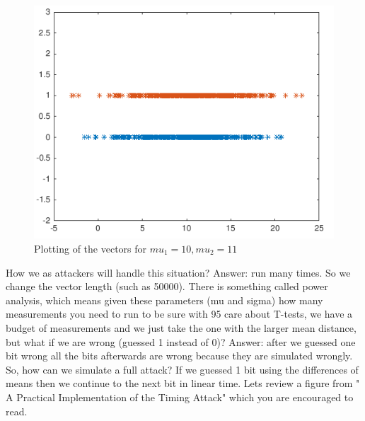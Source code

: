 \begin{figure}[!ht]
    \centering
    \includegraphics[scale=0.6]{images/defmatplot2.png}
    \caption{Plotting of the vectors for \(mu_1 = 10, mu_2 = 11\)} \label{fig:defmatplot2}
\end{figure}

How we as attackers will handle this situation? Answer: run many times. So we
change the vector length (such as 50000). There is something called power
analysis, which means given these parameters (mu and sigma) how many
measurements you need to run to be sure with 95%
care about T-tests, we have a budget of measurements and we just take the one
with the larger mean distance, but what if we are wrong (guessed 1 instead of
0)? Answer: after we guessed one bit wrong all the bits afterwards are wrong
because they are simulated wrongly. So, how can we simulate a full attack? If we
guessed 1 bit using the differences of means then we continue to the next bit in
linear time. Lets review  a figure from " A Practical Implementation of the
Timing Attack" which you are encouraged to read.



